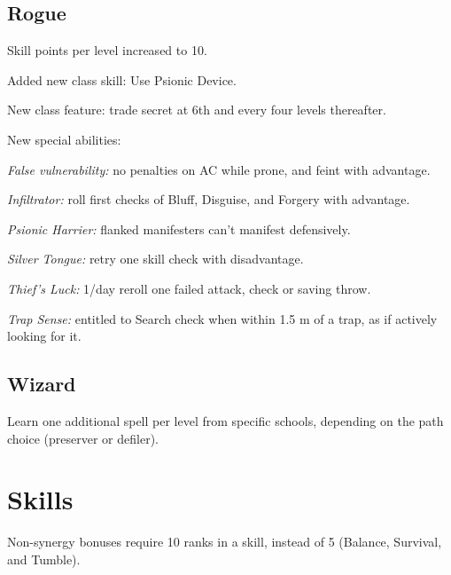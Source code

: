 \subsection{Rogue}
\begin{itemize*}
\item Skill points per level increased to 10.
\item Added new class skill: Use Psionic Device.
\item New class feature: trade secret at 6th and every four levels thereafter.
\item New special abilities:
	\begin{itemize*}
	\item \textit{False vulnerability:} no penalties on AC while prone, and feint with advantage.
	\item \textit{Infiltrator:} roll first checks of Bluff, Disguise, and Forgery with advantage.
	\item \textit{Psionic Harrier:} flanked manifesters can't manifest defensively.
	\item \textit{Silver Tongue:} retry one skill check with disadvantage.
	\item \textit{Thief's Luck:} 1/day reroll one failed attack, check or saving throw.
	\item \textit{Trap Sense:} entitled to Search check when within 1.5 m of a trap, as if actively looking for it.
	\end{itemize*}
\end{itemize*}

\subsection{Wizard}
\begin{itemize*}
\item Learn one additional spell per level from specific schools, depending on the path choice (preserver or defiler).
\end{itemize*}

\section{Skills}
Non-synergy bonuses require 10 ranks in a skill, instead of 5 (Balance, Survival, and Tumble).


